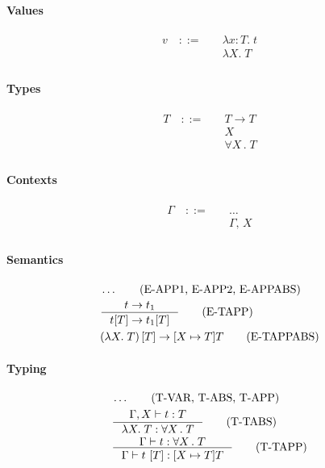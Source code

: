 \documentclass{article}
\newcommand{\lam}[2]{\lambda #1 .\;#2}
\newcommand{\lamt}[3]{\lambda #1: #2 .\;#3}
\newcommand{\tapp}[2]{#1\, \left[#2\right]}
\newcommand{\uquant}[2]{\forall #1 \, .\; #2}
\begin{document}
\paragraph{Values}
  \begin{align*}
    v \quad ::= \quad
      & \lamt{x}{T}{t} \tag{abstraction} \\
      & \lam{X}{T} \tag{type abstraction}\\
  \end{align*}

\paragraph{Types}
  \begin{align*}
    T \quad::=\quad & T\to T \tag{function type} \\
      & X \tag{type variable}\\
      & \uquant{X}{T} \tag{universal type}\\
  \end{align*}

\paragraph{Contexts}
  \begin{align*}
    \Gamma \quad ::= \quad & \ldots \tag{empty, variable binding} \\
      & \Gamma, \, X \tag{type variable} \\
  \end{align*}

\paragraph{Semantics}
  \begin{align*}
      & \ldots \tag{E-APP1, E-APP2, E-APPABS} \\
      & \inference
        {t \to t_1}
        {t [T] \to t_1 [T]}
        \tag{E-TAPP}\\
      & (\lam{X}{T})\,  [T] \to [X\mapsto T]T
        \tag{E-TAPPABS}\\
  \end{align*}

\paragraph{Typing}
  \begin{align*}
    & \ldots \tag{T-VAR, T-ABS, T-APP} \\
    & \inference
      {\Gamma, X\vdash t : T}
      {\lam{X}{T} : \uquant{X}{T}}
      \tag{T-TABS}\\
    & \inference
      {\Gamma\vdash t : \uquant{X}{T}}
      {\Gamma\vdash \tapp{t}{T} : [X\mapsto T] T}
      \tag{T-TAPP} \\
  \end{align*}
\end{document}
